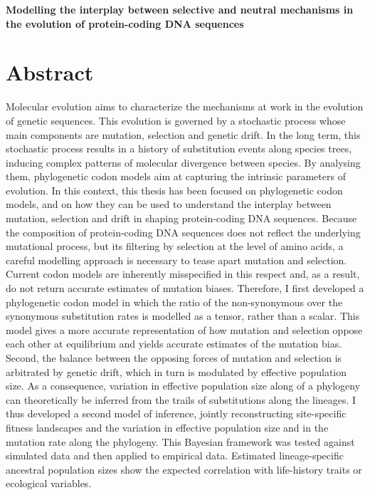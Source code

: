 \begin{center}
	\LARGE
	\textbf{Modelling the interplay between selective and neutral mechanisms in the evolution of protein-coding DNA sequences}
\end{center}

\section*{Abstract}

Molecular evolution aims to characterize the mechanisms at work in the evolution of genetic sequences.
This evolution is governed by a stochastic process whose main components are mutation, selection and genetic drift.
In the long term, this stochastic process results in a history of substitution events along species trees, inducing complex patterns of molecular divergence between species.
By analysing them, phylogenetic codon models aim at capturing the intrinsic parameters of evolution.
In this context, this thesis has been focused on phylogenetic codon models, and on how they can be used to understand the interplay between mutation, selection and drift in shaping protein-coding DNA sequences.
Because the composition of protein-coding DNA sequences does not reflect the underlying mutational process, but its filtering by selection at the level of amino acids, a careful modelling approach is necessary to tease apart mutation and selection.
Current codon models are inherently misspecified in this respect and, as a result, do not return accurate estimates of mutation biases.
Therefore, I first developed a phylogenetic codon model in which the ratio of the non-synonymous over the synonymous substitution rates is modelled as a tensor, rather than a scalar.
This model gives a more accurate representation of how mutation and selection oppose each other at equilibrium and yields accurate estimates of the mutation bias.
Second, the balance between the opposing forces of mutation and selection is arbitrated by genetic drift, which in turn is modulated by effective population size.
As a consequence, variation in effective population size along of a phylogeny can theoretically be inferred from the trails of substitutions along the lineages.
I thus developed a second model of inference, jointly reconstructing site-specific fitness landscapes and the variation in effective population size and in the mutation rate along the phylogeny.
This Bayesian framework was tested against simulated data and then applied to empirical data.
Estimated lineage-specific ancestral population sizes show the expected correlation with life-history traits or ecological variables.
